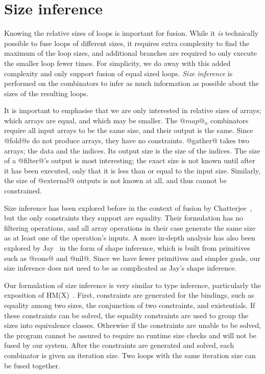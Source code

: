 \section{Size inference}
Knowing the relative sizes of loops is important for fusion.
While it \emph{is} technically possible to fuse loops of different sizes, it requires extra complexity to find the maximum of the loop sizes, and additional branches are required to only execute the smaller loop fewer times. For simplicity, we do away with this added complexity and only support fusion of equal sized loops. \emph{Size inference} is performed on the combinators to infer as much information as possible about the sizes of the resulting loops.

It is important to emphasise that we are only interested in relative sizes of arrays; which arrays are equal, and which may be smaller.
The $@map@_n$ combinators require all input arrays to be the same size, and their output is the same.
Since @fold@s do not produce arrays, they have no constraints.
@gather@ takes two arrays; the data and the indices. Its output size is the size of the indices.
The size of a @filter@'s output is most interesting; the exact size is not known until after it has been executed, only that it is less than or equal to the input size.
Similarly, the size of @external@ outputs is not known at all, and thus cannot be constrained.

Size inference has been explored before in the context of fusion by Chatterjee~\cite{chatterjee1991size}, but the only constraints they support are equality.
Their formulation has no filtering operations, and all array operations in their case generate the same size as at least one of the operation's inputs.
A more in-depth analysis has also been explored by Jay~\cite{jay1996shape} in the form of shape inference, which is built from primitives such as @cons@ and @nil@.
Since we have fewer primitives and simpler goals, our size inference does not need to be as complicated as Jay's shape inference.

Our formulation of size inference is very similar to type inference, particularly the exposition of HM(X)~\cite{odersky1999type}.
First, constraints are generated for the bindings, such as equality among two sizes, the conjunction of two constraints, and existentials.
If these constraints can be solved, the equality constraints are used to group the sizes into equivalence classes.
Otherwise if the constraints are unable to be solved, the program cannot be assured to require no runtime size checks and will not be fused by our system.
After the constraints are generated and solved, each combinator is given an iteration size.
Two loops with the same iteration size can be fused together.


